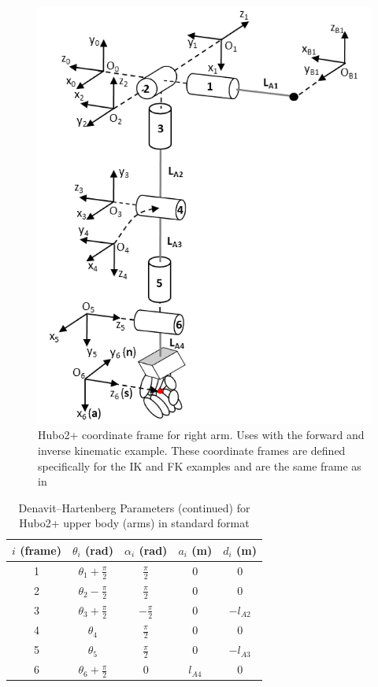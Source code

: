 \begin{figure}[thpb]
  \centering
\includegraphics[width=0.8\columnwidth]{./examples/pix/parkIKHuboArm.png}
\caption{Hubo2+ coordinate frame for right arm.  Uses with the forward and inverse kinematic example.  These coordinate frames are defined specifically for the IK and FK examples and are the same frame as in\cite{5649842}   }
\label{fig:IkFkCoordinateArm}
\end{figure}



\begin{table}
\centering
\caption{Denavit–Hartenberg Parameters (continued) for Hubo2+ upper body (arms) in standard format}
\begin{tabular}{| c || c | c | c | c|}
\hline
$i$ (frame)  & $\theta_i$ (rad)         & $\alpha_i$ (rad) & $a_i$ (m) & $d_i$ (m) \\
\hline
\hline
1            & $\theta_1+\frac{\pi}{2}$ & $\frac{\pi}{2}$  & 0         & 0          \\
\hline
2            & $\theta_2-\frac{\pi}{2}$ & $\frac{\pi}{2}$  & 0         & 0          \\
\hline
3            & $\theta_3+\frac{\pi}{2}$ & $-\frac{\pi}{2}$ & 0         & $-l_{A2}$  \\
\hline
4            & $\theta_4$               & $\frac{\pi}{2}$  & 0         & 0          \\
\hline
5            & $\theta_5$               & $\frac{\pi}{2}$  & 0         & $-l_{A3}$  \\
\hline
6            & $\theta_6+\frac{\pi}{2}$ & 0                & $l_{A4}$  & 0          \\

\hline

\end{tabular}\label{table:dhparamrightArm}
\end{table}


